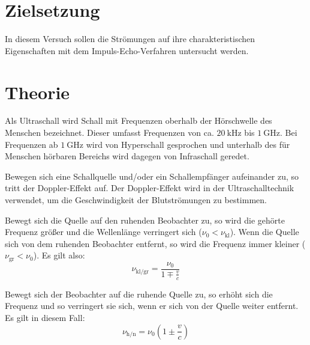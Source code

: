 \section{Zielsetzung}
\label{sec:Zielsetzung}

In diesem Versuch sollen die Strömungen auf ihre charakteristischen Eigenschaften mit dem Impuls-Echo-Verfahren untersucht werden.

\section{Theorie}
\label{sec:Theorie}

Als Ultraschall wird Schall mit Frequenzen oberhalb der Hörschwelle des Menschen bezeichnet. Dieser umfasst Frequenzen von ca. $\SI{20}{\kilo\hertz}$ bis $\SI{1}{\giga\hertz}$. Bei Frequenzen ab $\SI{1}{\giga\hertz}$ wird von Hyperschall gesprochen 
und unterhalb des für Menschen hörbaren Bereichs wird dagegen von Infraschall geredet.

Bewegen sich eine Schallquelle und/oder ein Schallempfänger aufeinander zu, so tritt der Doppler-Effekt auf. Der Doppler-Effekt wird in der Ultraschalltechnik verwendet, um die Geschwindigkeit der Blutströmungen zu bestimmen. 

Bewegt sich die Quelle auf den ruhenden Beobachter zu, so wird die gehörte Frequenz größer und die Wellenlänge verringert sich ($\nu_0 < \nu_\text{kl}$). Wenn die Quelle sich von dem ruhenden Beobachter entfernt, so wird die Frequenz immer kleiner 
($\nu_\text{gr} < \nu_0$).
Es gilt also:
\begin{equation*}
\label{eq:eq1}
\nu_\text{kl/gr} = \frac{\nu_0}{1 \mp \frac{v}{c}}
\end{equation*}

Bewegt sich der Beobachter auf die ruhende Quelle zu, so erhöht sich die Frequenz und so verringert sie sich, wenn er sich von der Quelle weiter entfernt.
Es gilt in diesem Fall:
\begin{equation*}
\label{eq:eq2}
\nu_\text{h/n} = \nu_0 \left(1 \pm \frac{v}{c}\right)
\end{equation*}

